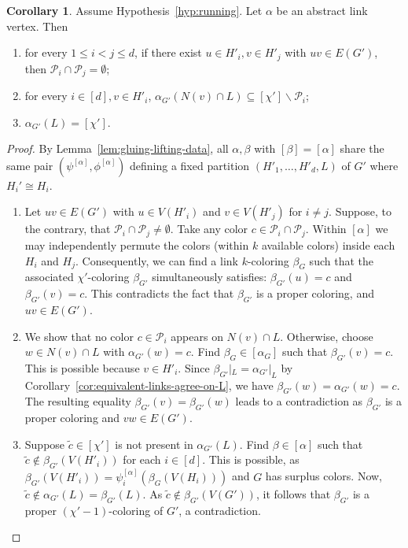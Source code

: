 \documentclass{amsart}
\theoremstyle{hypothesisstyle}
\theoremstyle{definition}
\newtheorem{corollary}[theorem]{Corollary}
\theoremstyle{remark}
\numberwithin{equation}{section}
\begin{document}
\begin{corollary}\label{cor:locked-vertices}
   Assume Hypothesis~\ref{hyp:running}. Let $\alpha$ be an abstract link vertex.  Then
    \begin{enumerate}
        \item\label{item:disjoint-palettes} for every $1\le i<j\le d$, if there exist $u\in H'_i,v\in H'_j$ with $uv\in E(G')$, then $\mathcal P_i\cap \mathcal P_j=\emptyset$; 
        \item\label{item:locked-palette} for every $i\in[d], v\in H'_i$, $\alpha_{G'}(N(v)\cap L)\subseteq [\chi']\backslash \mathcal P_i$;
        \item\label{item:every-color-locked} $\alpha_{G'}(L)=[\chi']$. 
        \end{enumerate}
\end{corollary}

\begin{proof}
By Lemma~\ref{lem:gluing-lifting-data}, all $\alpha, \beta$ with $[\beta]=[\alpha]$ share the same pair $(\psi^{[\alpha]},\phi^{[\alpha]})$ defining a fixed partition $(H'_1,\dots,H'_d, L)$ of $G'$ where $H_i'\cong H_i$. 
\begin{enumerate}
    \item Let $uv\in E(G')$ with $u\in V(H'_i)$ and $v\in V(H'_j)$ for $i\neq j$. Suppose, to the contrary, that $\mathcal{P}_i\cap\mathcal{P}_j\neq \emptyset$. Take any color $c\in\mathcal{P}_i\cap\mathcal{P}_j$.  Within $[\alpha]$ we may independently permute the colors (within $k$ available colors) inside each $H_i$ and $H_j$. Consequently, we can find a link $k$-coloring $\beta_{G}$ such that the associated $\chi'$-coloring $\beta_{G'}$ simultaneously satisfies: $\beta_{G'}(u)=c$ and $\beta_{G'}(v)=c$. This contradicts the fact that $\beta_{G'}$ is a proper coloring, and $uv\in E(G')$.
    \item We show that no color $c\in \mathcal{P}_i$ appears on $N(v)\cap L$. Otherwise, choose $w\in N(v)\cap L$ with $\alpha_{G'}(w)=c$. Find $\beta_G\in [\alpha_G]$ such that $\beta_{G'}(v)=c$. This is possible because $v\in H'_i$. Since $\beta_{G'}|_{L} = \alpha_{G'}|_{L}$ by Corollary~\ref{cor:equivalent-links-agree-on-L}, we have $\beta_{G'}(w)=\alpha_{G'}(w)=c$. The resulting equality $\beta_{G'}(v)=\beta_{G'}(w)$ leads to a contradiction as $\beta_{G'}$ is a proper coloring and $vw\in E(G')$. 
    \item Suppose $\tilde{c}\in [\chi']$ is not present in $\alpha_{G'}(L)$. Find $\beta\in [\alpha]$ such that $\tilde{c}\notin \beta_{G'}(V(H'_i))$ for each $i\in [d]$. This is possible, as $\beta_{G'}(V(H'_i))=\psi_{i}^{[\alpha]}(\beta_{G}(V(H_i)))$ and $G$ has surplus colors. Now, $\tilde{c}\notin \alpha_{G'}(L) = \beta_{G'}(L)$. As $\tilde{c}\notin \beta_{G'}(V(G'))$, it follows that $\beta_{G'}$ is a proper $(\chi'-1)$-coloring of $G'$, a contradiction. \qedhere
\end{enumerate}
\end{proof}
\end{document}
